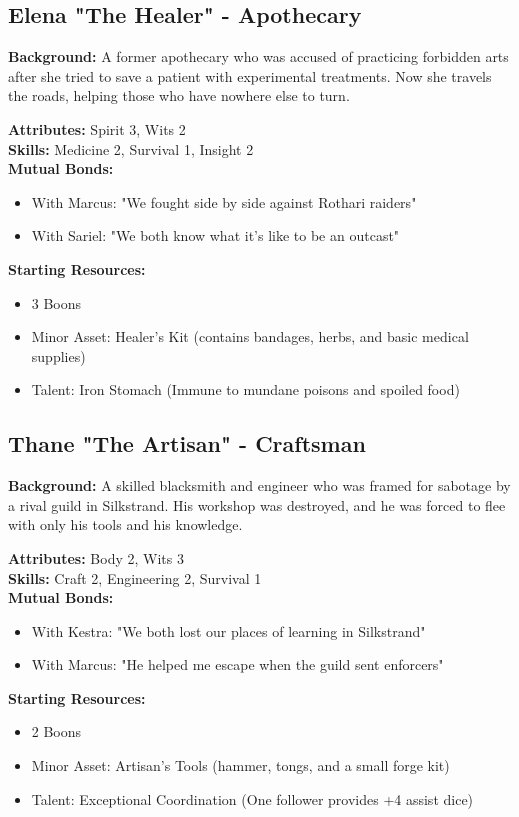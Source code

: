 \documentclass[11pt]{article}
\newenvironment{characterbox}[1]{%
  \begin{mdframed}[backgroundcolor=shadecolor, linewidth=1pt, linecolor=headercolor]%
  \subsection*{#1}%
}{%
  \end{mdframed}%
}
\begin{document}
\begin{characterbox}{Elena "The Healer" - Apothecary}
\textbf{Background:} A former apothecary who was accused of practicing forbidden arts after she tried to save a patient with experimental treatments. Now she travels the roads, helping those who have nowhere else to turn.

\textbf{Attributes:} Spirit 3, Wits 2 \\
\textbf{Skills:} Medicine 2, Survival 1, Insight 2 \\
\textbf{Mutual Bonds:} 
\begin{itemize}
\item With Marcus: "We fought side by side against Rothari raiders"
\item With Sariel: "We both know what it's like to be an outcast"
\end{itemize}

\textbf{Starting Resources:}
\begin{itemize}
\item 3 Boons
\item Minor Asset: Healer's Kit (contains bandages, herbs, and basic medical supplies)
\item Talent: Iron Stomach (Immune to mundane poisons and spoiled food)
\end{itemize}
\end{characterbox}

\begin{characterbox}{Thane "The Artisan" - Craftsman}
\textbf{Background:} A skilled blacksmith and engineer who was framed for sabotage by a rival guild in Silkstrand. His workshop was destroyed, and he was forced to flee with only his tools and his knowledge.

\textbf{Attributes:} Body 2, Wits 3 \\
\textbf{Skills:} Craft 2, Engineering 2, Survival 1 \\
\textbf{Mutual Bonds:} 
\begin{itemize}
\item With Kestra: "We both lost our places of learning in Silkstrand"
\item With Marcus: "He helped me escape when the guild sent enforcers"
\end{itemize}

\textbf{Starting Resources:}
\begin{itemize}
\item 2 Boons
\item Minor Asset: Artisan's Tools (hammer, tongs, and a small forge kit)
\item Talent: Exceptional Coordination (One follower provides +4 assist dice)
\end{itemize}
\end{characterbox}
\end{document}
